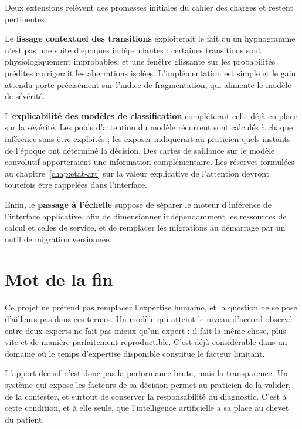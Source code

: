 Deux extensions relèvent des promesses initiales du cahier des charges et restent
pertinentes.

Le \textbf{lissage contextuel des transitions} exploiterait le fait qu'un hypnogramme
n'est pas une suite d'époques indépendantes : certaines transitions sont
physiologiquement improbables, et une fenêtre glissante sur les probabilités
prédites corrigerait les aberrations isolées. L'implémentation est simple et le gain
attendu porte précisément sur l'indice de fragmentation, qui alimente le modèle de
sévérité.

L'\textbf{explicabilité des modèles de classification} compléterait celle déjà en place
sur la sévérité. Les poids d'attention du modèle récurrent sont calculés à chaque
inférence sans être exploités ; les exposer indiquerait au praticien quels instants de
l'époque ont déterminé la décision. Des cartes de saillance sur le modèle convolutif
apporteraient une information complémentaire. Les réserves formulées au
chapitre~\ref{chap:etat-art} sur la valeur explicative de l'attention devront
toutefois être rappelées dans l'interface.

Enfin, le \textbf{passage à l'échelle} suppose de séparer le moteur d'inférence de
l'interface applicative, afin de dimensionner indépendamment les ressources de calcul
et celles de service, et de remplacer les migrations au démarrage par un outil de
migration versionnée.

\section*{Mot de la fin}

Ce projet ne prétend pas remplacer l'expertise humaine, et la question ne se pose
d'ailleurs pas dans ces termes. Un modèle qui atteint le niveau d'accord observé entre
deux experts ne fait pas mieux qu'un expert : il fait la même chose, plus vite et de
manière parfaitement reproductible. C'est déjà considérable dans un domaine où le
temps d'expertise disponible constitue le facteur limitant.

L'apport décisif n'est donc pas la performance brute, mais la transparence. Un système
qui expose les facteurs de sa décision permet au praticien de la valider, de la
contester, et surtout de conserver la responsabilité du diagnostic. C'est à cette
condition, et à elle seule, que l'intelligence artificielle a sa place au chevet du
patient.
